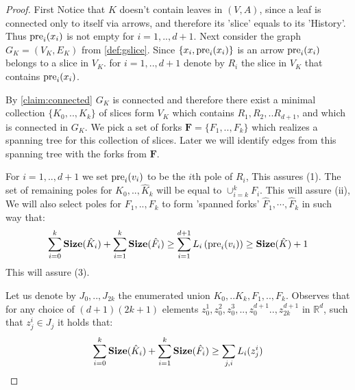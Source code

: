   \begin{proof}
    First Notice that $K$ doesn't contain leaves in $(V,A)$, since a leaf is connected only to itself via arrows, and therefore its 'slice' equals to its 'History'. Thus $\text{pre}_{i}(x_{i})$ is not empty for $i=1,..,d+1$. Next consider the graph $G_{K}= (V_{K},E_{K})$ from \cref{def:gslice}. Since $\{ x_{i}, \text{pre}_{i}(x_{i}) \}$ is an arrow $\text{pre}_{i}(x_{i})$ belongs to a slice in $V_{K}$. for $i=1,..,d+1$ denote by $R_{i}$ the slice in $V_{K}$ that contains $\text{pre}_{i}(x_i)$. 

    By \cref{claim:connected} $G_{K}$ is connected and therefore there exist a minimal collection $\{K_{0},..,K_{k}\}$ of slices form $V_{K}$ which contains $R_{1},R_{2},..R_{d+1}$, and which is connected in $G_{K}$. We pick a set of forks $\mathbf{F} = \{F_{1},..,F_{k} \}$ which realizes a spanning tree for this collection of slices. Later we will identify edges from this spanning tree with the forks from $\mathbf{F}$.  

    For $i=1,..,d+1$ we set $\text{pre}_{i}(v_{i})$ to be the $i$th pole of $R_{i}$, This assures (1). The set of remaining poles for $\hat{K}_0, ..,\hat{K}_{k}$ will be equal to $\cup^{k}_{i=k}F_{i}$. This will assure (ii), We will also select poles for $F_{1}, ..,F_{k}$ to form 'spanned forks' $\hat{F}_{1}, \cdots,\hat{F}_{k}$ in such way that:  
    \begin{equation*}
      \begin{split}
        \sum^{k}_{i=0}\mathbf{Size}(\hat{K}_{i}) + \sum^{k}_{i=1}\mathbf{Size}(\hat{F}_{i}) \ge \sum_{i=1}^{d+1}L_{i}\left( \text{pre}_{i}(v_{i}) \right) \ge \mathbf{Size}(\hat{K}) + 1
      \end{split}
    \end{equation*}
    This will assure (3). 

    Let us denote by $J_{0},..,J_{2k}$ the enumerated union $K_{0},..K_{k},F_{1},..,F_{k}$. Observes that for any choice of $(d+1)(2k+1)$ elements $z_{0}^{1},z_{0}^{2}, z_{0}^{3},..,z_{0}^{d+1}..,z_{2k}^{d+1}$ in $\mathbb{R}^{d}$, such that $z_{j}^{i} \in J_{j}$ it holds that:
    \begin{equation}
      \label{equ:spanlow}
      \begin{split}
         \sum^{k}_{i=0}\mathbf{Size}(\hat{K}_{i}) + \sum^{k}_{i=1}\mathbf{Size}(\hat{F}_{i})  \ge \sum_{j,i}L_{i}(z_{j}^{i})
      \end{split}
    \end{equation}


\end{proof}
